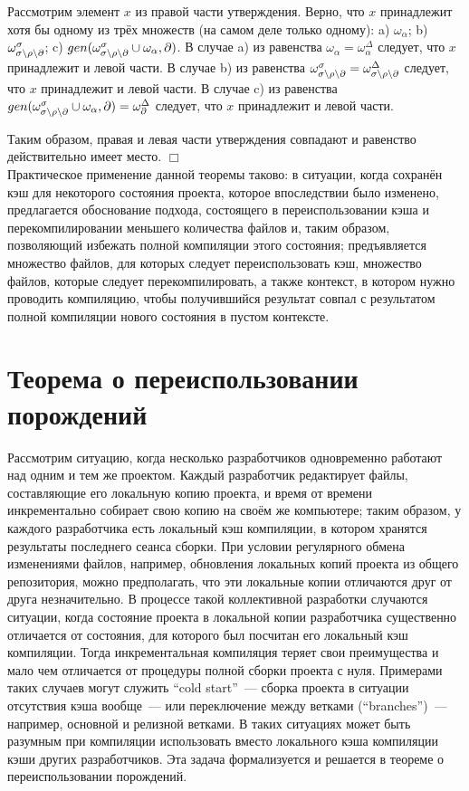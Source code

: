 Рассмотрим элемент $x$ из правой части утверждения. Верно, что $x$ принадлежит хотя бы одному из трёх множеств (на самом деле только одному): a) $\omega_\alpha$; b) $\omega^\sigma_{\sigma\setminus\rho\setminus\partial}$; c) $gen(\omega^\sigma_{\sigma\setminus\rho\setminus\partial} \cup \omega_\alpha, \partial)$. В случае a) из равенства $\omega_\alpha = \omega^\Delta_\alpha$ следует, что $x$ принадлежит и левой части. В случае b) из равенства $\omega^\sigma_{\sigma\setminus\rho\setminus\partial} = \omega^\Delta_{\sigma\setminus\rho\setminus\partial}$ следует, что $x$ принадлежит и левой части. В случае c) из равенства $gen(\omega^\sigma_{\sigma\setminus\rho\setminus\partial} \cup \omega_\alpha, \partial) = \omega^\Delta_\partial$ следует, что $x$ принадлежит и левой части.

Таким образом, правая и левая части утверждения совпадают и равенство действительно имеет место. $\Box$\\

Практическое применение данной теоремы таково: в ситуации, когда сохранён кэш для некоторого состояния проекта, которое впоследствии было изменено, предлагается обоснование подхода, состоящего в переиспользовании кэша и перекомпилировании меньшего количества файлов и, таким образом, позволяющий избежать полной компиляции этого состояния; предъявляется множество файлов, для которых следует переиспользовать кэш, множество файлов, которые следует перекомпилировать, а также контекст, в котором нужно проводить компиляцию, чтобы получившийся результат совпал с результатом полной компиляции нового состояния в пустом контексте.
 
\newpage
\section{Теорема о переиспользовании порождений}

Рассмотрим ситуацию, когда несколько разработчиков одновременно работают над одним и тем же проектом. Каждый разработчик редактирует файлы, составляющие его локальную копию проекта, и время от времени инкрементально собирает свою копию на своём же компьютере; таким образом, у каждого разработчика есть локальный кэш компиляции, в котором хранятся результаты последнего сеанса сборки. При условии регулярного обмена изменениями файлов, например, обновления локальных копий проекта из общего репозитория, можно предполагать, что эти локальные копии отличаются друг от друга незначительно. В процессе такой коллективной разработки случаются ситуации, когда состояние проекта в локальной копии разработчика существенно отличается от состояния, для которого был посчитан его локальный кэш компиляции. Тогда инкрементальная компиляция теряет свои преимущества и мало чем отличается от процедуры полной сборки проекта с нуля. Примерами таких случаев могут служить ``cold start''~--- сборка проекта в ситуации отсутствия кэша вообще~--- или переключение между ветками (``branches'')~--- например, основной и релизной ветками. В таких ситуациях может быть разумным при компиляции использовать вместо локального кэша компиляции кэши других разработчиков. Эта задача формализуется и решается в теореме о переиспользовании порождений.

